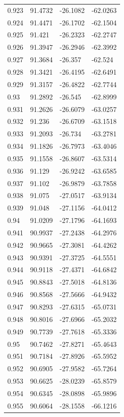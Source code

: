 \begin{tabular}{llll}
0.923 & 91.4732 & -26.1082 & -62.0263 \\
0.924 & 91.4471 & -26.1702 & -62.1504 \\
0.925 & 91.421 & -26.2323 & -62.2747 \\
0.926 & 91.3947 & -26.2946 & -62.3992 \\
0.927 & 91.3684 & -26.357 & -62.524 \\
0.928 & 91.3421 & -26.4195 & -62.6491 \\
0.929 & 91.3157 & -26.4822 & -62.7744 \\
0.93 & 91.2892 & -26.545 & -62.8999 \\
0.931 & 91.2626 & -26.6079 & -63.0257 \\
0.932 & 91.236 & -26.6709 & -63.1518 \\
0.933 & 91.2093 & -26.734 & -63.2781 \\
0.934 & 91.1826 & -26.7973 & -63.4046 \\
0.935 & 91.1558 & -26.8607 & -63.5314 \\
0.936 & 91.129 & -26.9242 & -63.6585 \\
0.937 & 91.102 & -26.9879 & -63.7858 \\
0.938 & 91.075 & -27.0517 & -63.9134 \\
0.939 & 91.048 & -27.1156 & -64.0412 \\
0.94 & 91.0209 & -27.1796 & -64.1693 \\
0.941 & 90.9937 & -27.2438 & -64.2976 \\
0.942 & 90.9665 & -27.3081 & -64.4262 \\
0.943 & 90.9391 & -27.3725 & -64.5551 \\
0.944 & 90.9118 & -27.4371 & -64.6842 \\
0.945 & 90.8843 & -27.5018 & -64.8136 \\
0.946 & 90.8568 & -27.5666 & -64.9432 \\
0.947 & 90.8293 & -27.6315 & -65.0731 \\
0.948 & 90.8016 & -27.6966 & -65.2032 \\
0.949 & 90.7739 & -27.7618 & -65.3336 \\
0.95 & 90.7462 & -27.8271 & -65.4643 \\
0.951 & 90.7184 & -27.8926 & -65.5952 \\
0.952 & 90.6905 & -27.9582 & -65.7264 \\
0.953 & 90.6625 & -28.0239 & -65.8579 \\
0.954 & 90.6345 & -28.0898 & -65.9896 \\
0.955 & 90.6064 & -28.1558 & -66.1216 \\

\end{tabular}
